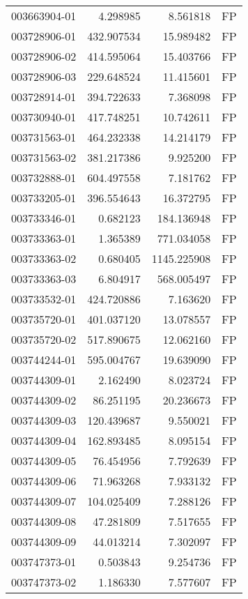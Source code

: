\begin{tabular}{lrrl}
003663904-01 &    4.298985 &     8.561818 &   FP \\
003728906-01 &  432.907534 &    15.989482 &   FP \\
003728906-02 &  414.595064 &    15.403766 &   FP \\
003728906-03 &  229.648524 &    11.415601 &   FP \\
003728914-01 &  394.722633 &     7.368098 &   FP \\
003730940-01 &  417.748251 &    10.742611 &   FP \\
003731563-01 &  464.232338 &    14.214179 &   FP \\
003731563-02 &  381.217386 &     9.925200 &   FP \\
003732888-01 &  604.497558 &     7.181762 &   FP \\
003733205-01 &  396.554643 &    16.372795 &   FP \\
003733346-01 &    0.682123 &   184.136948 &   FP \\
003733363-01 &    1.365389 &   771.034058 &   FP \\
003733363-02 &    0.680405 &  1145.225908 &   FP \\
003733363-03 &    6.804917 &   568.005497 &   FP \\
003733532-01 &  424.720886 &     7.163620 &   FP \\
003735720-01 &  401.037120 &    13.078557 &   FP \\
003735720-02 &  517.890675 &    12.062160 &   FP \\
003744244-01 &  595.004767 &    19.639090 &   FP \\
003744309-01 &    2.162490 &     8.023724 &   FP \\
003744309-02 &   86.251195 &    20.236673 &   FP \\
003744309-03 &  120.439687 &     9.550021 &   FP \\
003744309-04 &  162.893485 &     8.095154 &   FP \\
003744309-05 &   76.454956 &     7.792639 &   FP \\
003744309-06 &   71.963268 &     7.933132 &   FP \\
003744309-07 &  104.025409 &     7.288126 &   FP \\
003744309-08 &   47.281809 &     7.517655 &   FP \\
003744309-09 &   44.013214 &     7.302097 &   FP \\
003747373-01 &    0.503843 &     9.254736 &   FP \\
003747373-02 &    1.186330 &     7.577607 &   FP \\

\end{tabular}
